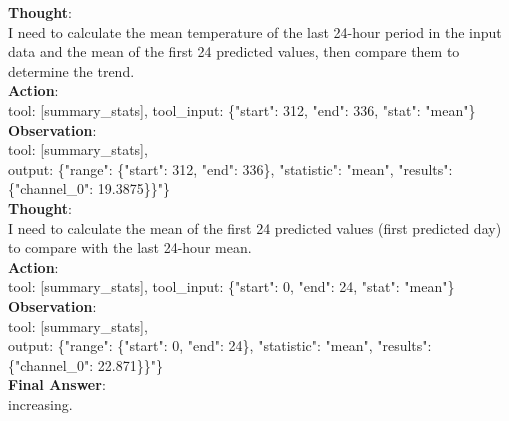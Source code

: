 \begin{tcolorbox}[
  colback=white,
  colframe=black!50,
  boxrule=0.3mm,
  width=\textwidth,
  rounded corners,
  title=Sample 3: Compound task,
  fonttitle=\bfseries,
  left=2mm, right=2mm, top=2mm, bottom=2mm
]
\textbf{Thought}: \\
I need to calculate the mean temperature of the last 24-hour period in the input data and the mean of the first 24 predicted values, then compare them to determine the trend. \\

\textbf{Action}: \\
tool: [summary\_stats], tool\_input: \{"start": 312, "end": 336, "stat": "mean"\} \\

\textbf{Observation}:\\
tool: [summary\_stats],\\
output: \{"range": \{"start": 312, "end": 336\}, "statistic": "mean", "results": \{"channel\_0": 19.3875\}\}"\} \\

\textbf{Thought}: \\
I need to calculate the mean of the first 24 predicted values (first predicted day) to compare with the last 24-hour mean. \\

\textbf{Action}: \\
tool: [summary\_stats], tool\_input: \{"start": 0, "end": 24, "stat": "mean"\} \\

\textbf{Observation}:\\
tool: [summary\_stats],\\
output: \{"range": \{"start": 0, "end": 24\}, "statistic": "mean", "results": \{"channel\_0": 22.871\}\}"\} \\

\textbf{Final Answer}:\\
increasing.
\end{tcolorbox}

